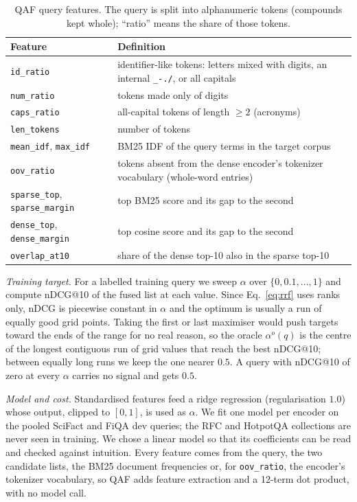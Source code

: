 \begin{table}[t]
\centering
\caption{QAF query features. The query is split into alphanumeric tokens
(compounds kept whole); ``ratio'' means the share of those tokens.}
\label{tab:features}
\footnotesize
\begin{tabular}{@{}>{\raggedright\arraybackslash}p{}>{\raggedright\arraybackslash}p{}@{}}
\toprule
Feature & Definition \\
\midrule
\texttt{id\_ratio} & identifier-like tokens: letters mixed with digits, an internal \texttt{\_-./}, or all capitals \\
\texttt{num\_ratio} & tokens made only of digits \\
\texttt{caps\_ratio} & all-capital tokens of length $\ge 2$ (acronyms) \\
\texttt{len\_tokens} & number of tokens \\
\texttt{mean\_idf}, \texttt{max\_idf} & BM25 IDF of the query terms in the target corpus \\
\texttt{oov\_ratio} & tokens absent from the dense encoder's tokenizer vocabulary (whole-word entries) \\
\texttt{sparse\_top}, \texttt{sparse\_margin} & top BM25 score and its gap to the second \\
\texttt{dense\_top}, \texttt{dense\_margin} & top cosine score and its gap to the second \\
\texttt{overlap\_at10} & share of the dense top-10 also in the sparse top-10 \\
\bottomrule
\end{tabular}
\end{table}

\textit{Training target.} For a labelled training query we sweep $\alpha$ over
$\{0,0.1,\dots,1\}$ and compute nDCG@10 of the fused list at each value. Since
Eq.~\eqref{eq:rrf} uses ranks only, nDCG is piecewise constant in $\alpha$ and
the optimum is usually a run of equally good grid points. Taking the first or
last maximiser would push targets toward the ends of the range for no real
reason, so the oracle $\alpha^{o}(q)$ is the centre of the longest contiguous
run of grid values that reach the best nDCG@10; between equally long runs we
keep the one nearer $0.5$. A query with nDCG@10 of zero at every $\alpha$
carries no signal and gets $0.5$.

\textit{Model and cost.} Standardised features feed a ridge regression
(regularisation $1.0$) whose output, clipped to $[0,1]$, is used as $\alpha$.
We fit one model per encoder on the pooled SciFact and FiQA dev queries; the
RFC and HotpotQA collections are never seen in training. We chose a linear
model so that its coefficients can be read and checked against intuition.
Every feature comes from the query, the two candidate lists, the BM25
document frequencies or, for \texttt{oov\_ratio}, the encoder's tokenizer
vocabulary, so QAF adds feature extraction and a 12-term dot product, with no
model call.

